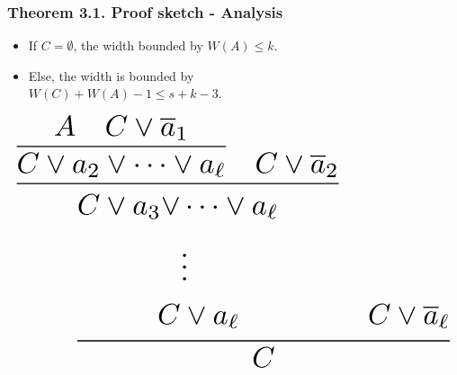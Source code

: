 \documentclass[t,usenames,dvipsnames]{beamer}
\begin{document}
\begin{frame}\frametitle{Theorem 3.1. Proof sketch - Analysis}
	\noindent%
	\begin{minipage}[t]{.67\linewidth}
	\begin{itemize}[<+->]
		\item If $C = \emptyset$, the width bounded by $W(A) \leq k$.
		\item Else, the width is bounded by\\
			\hspace{1cm}$W(C) + W(A) - 1 \leq s + k - 3$.
	\end{itemize}
	\end{minipage}%
	\hfill%
	\begin{minipage}[t]{0.3\linewidth}
	$$
	\resizebox{\hsize}{!}{%
	\infer{C}{
		\infer{\begin{aligned}C \lor a_3 \lor& \dots \lor a_{\ell}\\ &\vdots\\ C &\lor
		a_{\ell} \end{aligned}}
		{
			\infer{C \lor a_2 \lor \dots \lor a_{\ell}}
			{A & C\lor \overline a_1}
		     	&C \lor \overline a_2
		}
	& \begin{aligned}\vphantom{A}\\ \vphantom{\vdots}\\ C \lor \overline
	a_{\ell}\end{aligned}}%
	}
	$$
	\end{minipage}

	\begin{center}%
	\end{center}%
	\pause
\end{frame}
\end{document}
